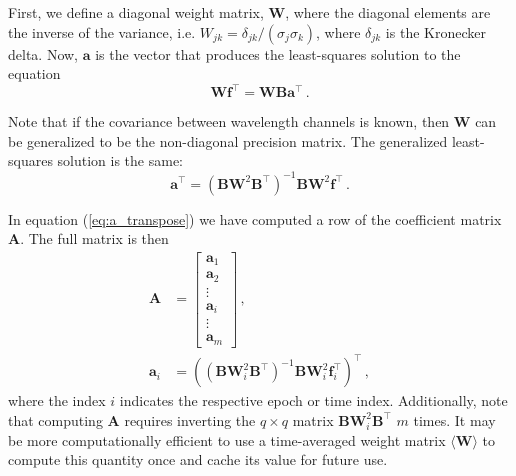 \documentclass[twocolumn,linenumbers]{aastex7}
\begin{document}
First, we define a diagonal weight matrix, $\mathbf{W}$, where the diagonal elements are the inverse of the variance, i.e. $W_{jk} = \delta_{jk}/(\sigma_j\sigma_k)$, where $\delta_{jk}$ is the Kronecker delta. Now, $\bm{a}$ is the vector that produces the least-squares solution to the equation
\begin{equation}
    \mathbf{W}\bm{f}^\top = \mathbf{W}\mathbf{B}\bm{a}^\top\,.
\end{equation}

Note that if the covariance between wavelength channels is known, then $\mathbf{W}$ can be generalized to be the non-diagonal precision matrix. The generalized least-squares solution is the same:
\begin{equation}
    \label{eq:a_transpose}
    \bm{a}^\top = (
        \mathbf{B}\mathbf{W}^2\mathbf{B}^\top
    )^{-1} \mathbf{B}\mathbf{W}^2 \bm{f}^\top\, .
\end{equation}

In equation (\ref{eq:a_transpose}) we have computed a row of the coefficient matrix $\mathbf{A}$. The full matrix is then
\begin{align}
    \mathbf{A} &= \begin{bmatrix}
        \bm{a}_1 \\ \bm{a}_2 \\ \vdots \\ \bm{a}_i \\ \vdots \\ \bm{a}_m 
    \end{bmatrix}\, , \\
    \bm{a}_i &= (
        (
        \mathbf{B}\mathbf{W}_i^2\mathbf{B}^\top
    )^{-1} \mathbf{B}\mathbf{W}_i^2 \bm{f}_i^\top
    )^\top\, ,
\end{align}
where the index $i$ indicates the respective epoch or time index. Additionally, note that computing $\mathbf{A}$ requires inverting the $q\times q$ matrix $\mathbf{B}\mathbf{W}_i^2\mathbf{B}^\top$ $m$ times. It may be more computationally efficient to use a time-averaged weight matrix $\langle\mathbf{W}\rangle$ to compute this quantity once and cache its value for future use.
\end{document}

